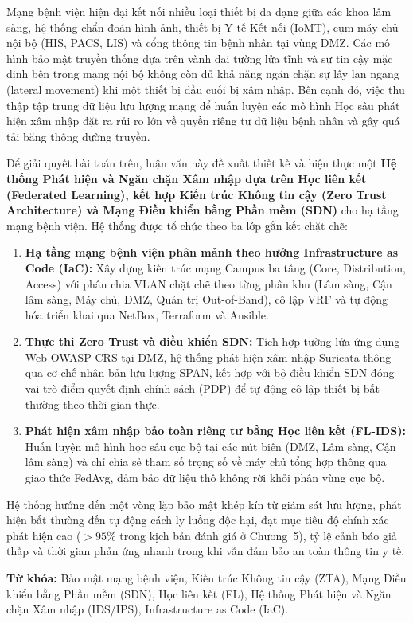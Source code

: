 
Mạng bệnh viện hiện đại kết nối nhiều loại thiết bị đa dạng giữa các khoa lâm sàng, hệ thống chẩn đoán hình ảnh, thiết bị Y tế Kết nối (IoMT), cụm máy chủ nội bộ (HIS, PACS, LIS) và cổng thông tin bệnh nhân tại vùng DMZ. Các mô hình bảo mật truyền thống dựa trên vành đai tường lửa tĩnh và sự tin cậy mặc định bên trong mạng nội bộ không còn đủ khả năng ngăn chặn sự lây lan ngang (lateral movement) khi một thiết bị đầu cuối bị xâm nhập. Bên cạnh đó, việc thu thập tập trung dữ liệu lưu lượng mạng để huấn luyện các mô hình Học sâu phát hiện xâm nhập đặt ra rủi ro lớn về quyền riêng tư dữ liệu bệnh nhân và gây quá tải băng thông đường truyền.

Để giải quyết bài toán trên, luận văn này đề xuất thiết kế và hiện thực một \textbf{Hệ thống Phát hiện và Ngăn chặn Xâm nhập dựa trên Học liên kết (Federated Learning), kết hợp Kiến trúc Không tin cậy (Zero Trust Architecture) và Mạng Điều khiển bằng Phần mềm (SDN)} cho hạ tầng mạng bệnh viện. Hệ thống được tổ chức theo ba lớp gắn kết chặt chẽ:
\begin{enumerate}[leftmargin=1.8em, itemsep=4pt]
  \item \textbf{Hạ tầng mạng bệnh viện phân mảnh theo hướng Infrastructure as Code (IaC):} Xây dựng kiến trúc mạng Campus ba tầng (Core, Distribution, Access) với phân chia VLAN chặt chẽ theo từng phân khu (Lâm sàng, Cận lâm sàng, Máy chủ, DMZ, Quản trị Out-of-Band), cô lập VRF và tự động hóa triển khai qua NetBox, Terraform và Ansible.
  \item \textbf{Thực thi Zero Trust và điều khiển SDN:} Tích hợp tường lửa ứng dụng Web OWASP CRS tại DMZ, hệ thống phát hiện xâm nhập Suricata thông qua cơ chế nhân bản lưu lượng SPAN, kết hợp với bộ điều khiển SDN đóng vai trò điểm quyết định chính sách (PDP) để tự động cô lập thiết bị bất thường theo thời gian thực.
  \item \textbf{Phát hiện xâm nhập bảo toàn riêng tư bằng Học liên kết (FL-IDS):} Huấn luyện mô hình học sâu cục bộ tại các nút biên (DMZ, Lâm sàng, Cận lâm sàng) và chỉ chia sẻ tham số trọng số về máy chủ tổng hợp thông qua giao thức FedAvg, đảm bảo dữ liệu thô không rời khỏi phân vùng cục bộ.
\end{enumerate}

Hệ thống hướng đến một vòng lặp bảo mật khép kín từ giám sát lưu lượng, phát hiện bất thường đến tự động cách ly luồng độc hại, đạt mục tiêu độ chính xác phát hiện cao ($>95\%$ trong kịch bản đánh giá ở Chương~5), tỷ lệ cảnh báo giả thấp và thời gian phản ứng nhanh trong khi vẫn đảm bảo an toàn thông tin y tế.

\vspace{0.5cm}
\noindent\textbf{Từ khóa:} Bảo mật mạng bệnh viện, Kiến trúc Không tin cậy (ZTA), Mạng Điều khiển bằng Phần mềm (SDN), Học liên kết (FL), Hệ thống Phát hiện và Ngăn chặn Xâm nhập (IDS/IPS), Infrastructure as Code (IaC).
